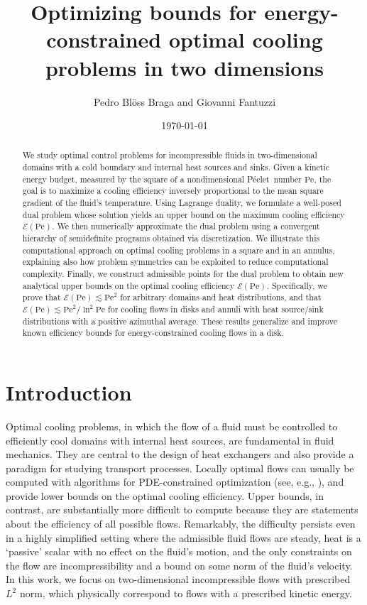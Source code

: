 \documentclass[a4paper, 10pt]{amsart}
\title[Optimizing bounds for energy-constrained cooling in 2D]{Optimizing bounds for energy-constrained optimal cooling problems in two dimensions}
\author{Pedro Bl\"oss Braga and Giovanni Fantuzzi}
\date{\today}
\numberwithin{equation}{section}
\theoremstyle{plain}
\theoremstyle{definition}
\theoremstyle{remark}
\newcommand{\Pe}{\mathrm{Pe}}
\newcommand{\efficiency}{\mathcal{E}}
\newcommand{\Peclet}{P\'eclet}
\begin{document}
\begin{abstract}
We study optimal control problems for incompressible fluids in two-dimensional domains with a cold boundary and internal heat sources and sinks. Given a kinetic energy budget, measured by the square of a nondimensional \Peclet\ number $\Pe$, the goal is to maximize a cooling efficiency inversely proportional to the mean square gradient of the fluid's temperature.
Using Lagrange duality, we formulate a well-posed dual problem whose solution yields an upper bound on the maximum cooling efficiency $\efficiency(\Pe)$. We then numerically approximate the dual problem using a convergent hierarchy of semidefinite programs obtained via discretization.
We illustrate this computational approach on optimal cooling problems in a square and in an annulus, explaining also how problem symmetries can be exploited to reduce computational complexity. Finally, we construct admissible points for the dual problem to obtain new analytical upper bounds on the optimal cooling efficiency $\efficiency(\Pe)$. Specifically, we prove that $\efficiency(\Pe) \lesssim \Pe^{2}$ for arbitrary domains and heat distributions, and that $\efficiency(\Pe) \lesssim \Pe^{2}/ \ln^2\Pe$ for cooling flows in disks and annuli with heat source/sink distributions with a positive azimuthal average. These results generalize and improve known efficiency bounds for energy-constrained cooling flows in a disk.
\end{abstract}

\maketitle

\section{Introduction}
Optimal cooling problems, in which the flow of a fluid must be controlled to efficiently cool domains with internal heat sources, 
are fundamental in fluid mechanics. They are central to the design of heat exchangers and also provide a paradigm for studying transport processes.
Locally optimal flows can usually be computed with algorithms for PDE-constrained optimization (see, e.g., \cite{Hassanzadeh2014,Alben2017a,Alben2017b,Motoki2018,Souza2020}), and provide lower bounds on the optimal cooling efficiency. Upper bounds, in contrast, are substantially more difficult to compute because they are statements about the efficiency of all possible flows.
Remarkably, the difficulty persists even in a highly simplified setting where the admissible fluid flows are steady, heat is a ‘passive’ scalar with no effect on the fluid's motion, and the only constraints on the flow are incompressibility and a bound on some norm of the fluid's velocity. In this work, we focus on two-dimensional incompressible flows with prescribed $L^2$ norm, which physically correspond to flows with a prescribed kinetic energy.
\end{document}
